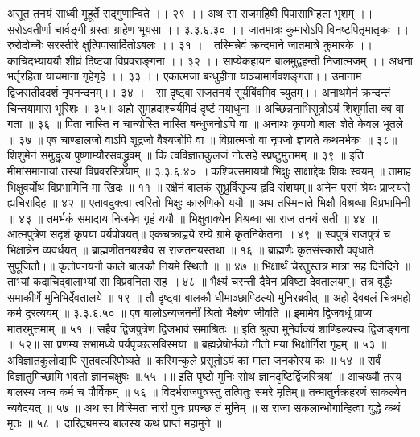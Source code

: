 असूत तनयं साध्वी मूहूर्ते सद्गुणान्विते ।। २९ ।।
अथ सा राजमहिषी पिपासाभिहता भृशम् ।।
सरोऽवतीर्णा चार्वङ्गी ग्रस्ता ग्राहेण भूयसा ।। ३.३.६.३० ।।
जातमात्रः कुमारोऽपि विनष्टपितृमातृकः ।।
रुरोदोच्चैः सरस्तीरे क्षुत्पिपासार्दितोऽबलः ।। ३१ ।।
तस्मिन्नेवं क्रन्दमाने जातमात्रे कुमारके ।।
काचिदभ्याययौ शीघ्रं दिष्ट्या विप्रवराङ्गना ।। ३२ ।।
साप्येकहायनं बालमुद्वहन्ती निजात्मजम् ।।
अधना भर्तृरहिता याचमाना गृहेगृहे ।। ३३ ।।
एकात्मजा बन्धुहीना याञ्चामार्गवशङ्गता।।
उमानाम द्विजसतीददर्श नृपनन्दनम्।। ३४ ।।
सा दृष्ट्वा राजतनयं सूर्यबिंवमिव च्युतम्।।
अनाथमेनं क्रन्दन्तं चिन्तयामास भूरिशः ॥ ३५॥
अहो सुमहदाश्चर्यमिदं दृष्टं मयाधुना ॥
अच्छिन्ननाभिसूत्रोऽयं शिशुर्माता क्व वा गता ॥ ३६ ॥
पिता नास्ति न चान्योस्ति नास्ति बन्धुजनोऽपि वा ॥
अनाथः कृपणो बालः शेते केवल भूतले ॥ ३७ ॥
एष चाण्डालजो वाऽपि शूद्रजो वैश्यजोपि वा ॥
विप्रात्मजो वा नृपजो ज्ञायते कथमर्भकः ॥ ३८॥
शिशुमेनं समुद्धृत्य पुष्णाम्यौरसवद्ध्रुवम् ॥
किं त्वविज्ञातकुलजं नोत्सहे स्प्रष्टुमुत्तमम् ॥ ३९ ॥
इति मीमांसमानायां तस्यां विप्रवरस्त्रियाम् ॥ ३.३.६.४० ॥
कश्चित्समाययौ भिक्षुः साक्षाद्देवः शिवः स्वयम् ॥
तामाह भिक्षुवर्योथ विप्रभामिनि मा खिदः ॥ ११ ॥
रक्षैनं बालकं सुभ्रुर्विसृज्य हृदि संशयम्॥
अनेन परमं श्रेयः प्राप्स्यसे ह्यचिरादेिह ॥ ४२ ॥
एतावदुक्त्वा त्वरितो भिक्षुः कारुणिको ययौ ॥
अथ तस्मिन्गते भिक्षौ विश्रब्धा विप्रभामिनी ॥ ४३ ॥
तमर्भकं समादाय निजमेव गृहं ययौ ॥
भिक्षुवाक्येन विश्रब्धा सा राज तनयं सती ॥ ४४ ॥
आत्मपुत्रेण सदृशं कृपया पर्यपोषयत्॥
एकचक्राह्वये रम्ये ग्रामे कृतनिकेतना ॥ ४९ ॥
स्वपुत्रं राजपुत्रं च भिक्षान्नेन व्यवर्धयत् ॥
ब्राह्मणीतनयश्चैव स राजतनयस्तथा ॥ १६ ॥
ब्राह्मणैः कृतसंस्कारौ ववृधाते सुपूजितौ।॥
कृतोपनयनौ काले बालकौ नियमे स्थितौ ॥ ॥ ४७ ॥
भिक्षार्थं चेरतुस्तत्र मात्रा सह दिनेदिने ॥
ताभ्यां कदाचिद्बालाभ्यां सा विप्रवनिता सह ॥ ४८ ॥
भैक्ष्यं चरन्ती दैवेन प्रविष्टा देवतालयम्॥
तत्र वृद्धैः समाकीर्णे मुनिभिर्देवतालये ॥ १९ ॥
तौ दृष्ट्वा बालकौ धीमाञ्छाण्डिल्यो मुनिरब्रवीत् ॥
अहो दैवबलं चित्रमहो कर्म दुरत्ययम् ॥ ३.३.६.५० ॥
एष बालोऽन्यजननीं श्रितो भैक्ष्येण जीवति ॥
इमामेव द्विजवधूं प्राप्य मातरमुत्तमाम् ॥ ५१ ॥
सहैव द्विजपुत्रेण द्विजभावं समाश्रितः ॥
इति श्रुत्वा मुनेर्वाक्यं शाण्डिल्यस्य द्विजाङ्गना ॥ ५२॥
सा प्रणम्य सभामध्ये पर्यपृच्छत्सविस्मया ॥
ब्रह्मन्नेषोर्भको नीतो मया भिक्षोर्गिरा गृहम् ॥ ५३ ॥
अविज्ञातकुलोद्यापि सुतवत्परिपोष्यते ॥
कस्मिन्कुले प्रसूतोऽयं का माता जनकोस्य कः ॥ ५४ ॥
सर्वं विज्ञातुमिच्छामि भवतो ज्ञानचक्षुषः ॥.५५ ।॥
इति पृष्टो मुनिः सोथ ज्ञानदृष्टिर्द्विजस्त्रियां ॥
आचख्यौ तस्य बालस्य जन्म कर्म च पौर्विकम् ॥ ५६ ॥
विदर्भराजपुत्रस्तु तत्पितुः समरे मृतिम्॥
तन्मातुर्नक्रहरणं साकल्येन न्यवेदयत् ॥ ५७ ॥
अथ सा विस्मिता नारी पुनः प्रपच्छ तं मुनिम् ॥
स राजा सकलान्भोगान्हित्वा युद्धे कथं मृतः ॥ ५८ ॥
दारिद्र्यमस्य बालस्य कथं प्राप्तं महामुने ॥
